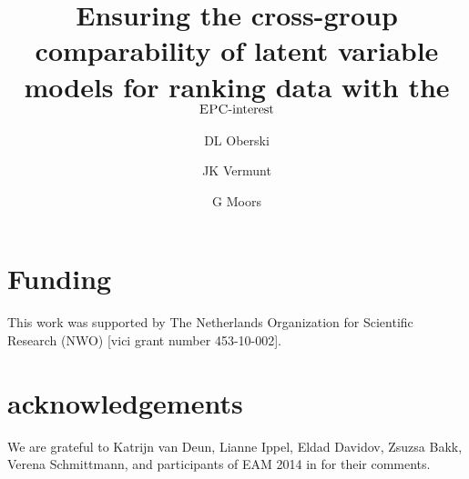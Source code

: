 \documentclass[letterpaper,12pt]{article}
\title{Ensuring the cross-group comparability of latent variable models for ranking data with the $\textrm{{\sc {EPC}}-interest}$}
\date{Department of Methodology and Statistics\\Tilburg University, The Netherlands\\
\raggedright\vspace{12pt}\footnotesize
Address: \\
Room P 1105, 
PO Box 90153, 5000 LE Tilburg\\
Phone:	+31 13 466 2959\\
Email: 	d.oberski@tilburguniversity.edu\\
}
\author{DL Oberski \and JK Vermunt \and G Moors}
\begin{document}
\maketitle


\vspace{-28pt}
\section*{Funding}

This work was supported by The Netherlands Organization for Scientific Research (NWO) [vici grant number 453-10-002].

\section*{acknowledgements}

We are grateful to Katrijn van Deun, Lianne Ippel, Eldad Davidov, Zsuzsa Bakk, Verena Schmittmann, and participants of EAM 2014 in for their comments.
\end{document}
